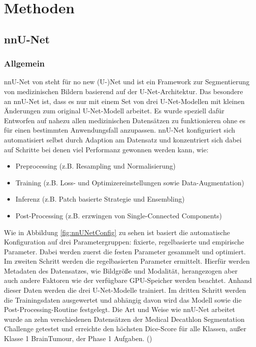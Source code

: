 \chapter{Methoden}
\section{nnU-Net}
\subsection{Allgemein}
nnU-Net von \citeauthor{Isensee.2021} steht für \glqq no new (U-)Net\grqq{} und ist ein Framework zur Segmentierung von medizinischen Bildern basierend auf der U-Net-Architektur. Das besondere an nnU-Net ist, dass es nur mit einem Set von drei U-Net-Modellen mit kleinen Änderungen zum original U-Net-Modell arbeitet. Es wurde speziell dafür Entworfen auf nahezu allen medizinischen Datensätzen zu funktionieren ohne es für einen bestimmten Anwendungsfall anzupassen. nnU-Net konfiguriert sich automatisiert selbst durch Adaption am Datensatz und konzentriert sich dabei auf Schritte bei denen viel Performanz gewonnen werden kann, wie:
\begin{itemize}
\item Preprocessing (z.B. Resampling und Normalisierung)
\item Training (z.B. Loss- und Optimizereinstellungen sowie Data-Augmentation)
\item Inferenz (z.B. Patch basierte Strategie und Ensembling)
\item Post-Processing (z.B. erzwingen von Single-Connected Components)
\end{itemize}

Wie in Abbildung \ref{fig:nnUNetConfig} zu sehen ist basiert die automatische Konfiguration auf drei Parametergruppen: fixierte, regelbasierte und empirische Parameter. Dabei werden zuerst die festen Parameter gesammelt und optimiert. Im zweiten Schritt werden die regelbasierten Parameter ermittelt. Hierfür werden Metadaten des Datensatzes, wie Bildgröße und Modalität, herangezogen aber auch andere Faktoren wie der verfügbare GPU-Speicher werden beachtet. Anhand dieser Daten werden die drei U-Net-Modelle trainiert. Im dritten Schritt werden die Trainingsdaten ausgewertet und abhängig davon wird das Modell sowie die Post-Processing-Routine festgelegt. Die Art und Weise wie nnU-Net arbeitet wurde an zehn verschiedenen Datensätzen der Medical Decathlon Segmentation Challenge getestet und erreichte den höchsten Dice-Score für alle Klassen, außer Klasse 1 BrainTumour, der Phase 1 Aufgaben. (\cite{Isensee.2018})

